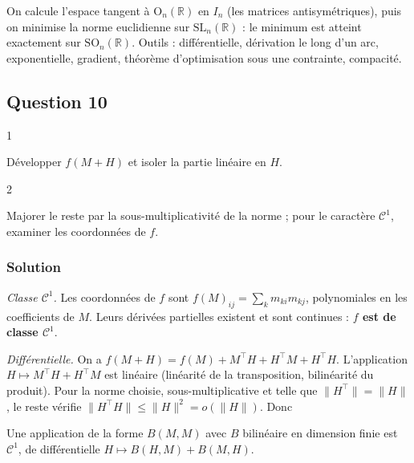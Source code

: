 \documentclass[11pt,a4paper]{article}
\newcommand{\equationajustee}[1]{%
  \sbox{\boiteequation}{$\displaystyle #1$}%
  \ifdim\wd\boiteequation>\linewidth
    \[\resizebox{\linewidth}{!}{\usebox{\boiteequation}}\]%
  \else
    \[#1\]%
  \fi}
\begin{document}
On calcule l'espace tangent à \({\mathrm{O}}_n(\mathbb{R})\) en \(I_n\) (les matrices antisymétriques), puis on minimise la norme euclidienne sur \({\mathrm{SL}}_n(\mathbb{R})\) : le minimum est atteint exactement sur \({\mathrm{SO}}_n(\mathbb{R})\). Outils : différentielle, dérivation le long d'un arc, exponentielle, gradient, théorème d'optimisation sous une contrainte, compacité.

\hypertarget{question-10}{%
\subsection{Question 10}\label{question-10}}

\begin{indication}{1}

Développer \(f(M+H)\) et isoler la partie linéaire en \(H\).

\end{indication}

\begin{indication}{2}

Majorer le reste par la sous-multiplicativité de la norme ; pour le caractère \({\mathcal{C}}^1\), examiner les coordonnées de \(f\).

\end{indication}

\hypertarget{solution-9}{%
\subsubsection{Solution}\label{solution-9}}

\emph{Classe \({\mathcal{C}}^1\).} Les coordonnées de \(f\) sont \(f(M)_{ij}=\sum_k m_{ki}m_{kj}\), polynomiales en les coefficients de \(M\). Leurs dérivées partielles existent et sont continues : \textbf{\(f\) est de classe \({\mathcal{C}}^1\)}.

\emph{Différentielle.} On a \(f(M+H)=f(M)+M^\top H+H^\top M+H^\top H\). L'application \(H\mapsto M^\top H+H^\top M\) est linéaire (linéarité de la transposition, bilinéarité du produit). Pour la norme choisie, sous-multiplicative et telle que \(\|H^\top\|=\|H\|\), le reste vérifie \(\|H^\top H\|\le\|H\|^2=o(\|H\|)\). Donc

\equationajustee{\boxed{\mathrm{d}f(M)\cdot H=M^\top H+H^\top M.}}

\begin{methode}

Une application de la forme \(B(M,M)\) avec \(B\) bilinéaire en dimension finie est \({\mathcal{C}}^1\), de différentielle \(H\mapsto B(H,M)+B(M,H)\).

\end{methode}
\end{document}
